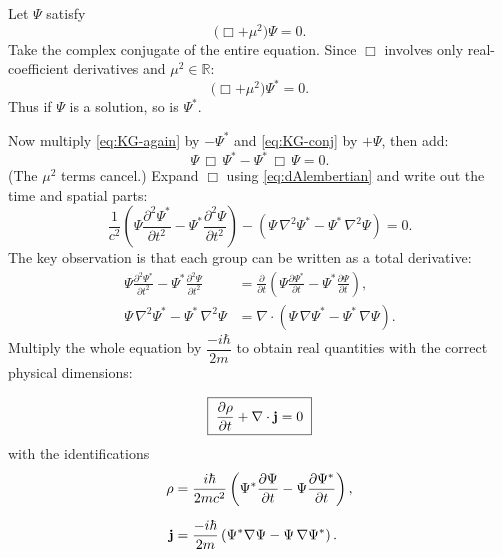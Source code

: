 \documentclass[12pt, a4paper]{article}
\theoremstyle{definition}
\begin{document}
\begin{derivation}
Let $\Psi$ satisfy
\begin{equation}\label{eq:KG-again}
    \bigl(\Box + \mu^{2}\bigr)\Psi = 0.
\end{equation}
Take the complex conjugate of the entire equation.  Since $\Box$ involves
only real-coefficient derivatives and $\mu^{2}\in\mathbb{R}$:
\begin{equation}\label{eq:KG-conj}
    \bigl(\Box + \mu^{2}\bigr)\Psi^{*} = 0.
\end{equation}
Thus if $\Psi$ is a solution, so is $\Psi^{*}$.

Now multiply \eqref{eq:KG-again} by $-\Psi^{*}$ and \eqref{eq:KG-conj} by
$+\Psi$, then add:
\begin{equation}\label{eq:subtracted}
    \Psi\,\Box\,\Psi^{*} - \Psi^{*}\,\Box\,\Psi = 0.
\end{equation}
(The $\mu^{2}$ terms cancel.)  Expand $\Box$ using \eqref{eq:dAlembertian}
and write out the time and spatial parts:
\[
    \frac{1}{c^{2}}\left(
      \Psi\frac{\partial^{2}\Psi^{*}}{\partial t^{2}}
      - \Psi^{*}\frac{\partial^{2}\Psi}{\partial t^{2}}
    \right)
    -\left(
      \Psi\,\nabla^{2}\Psi^{*}
      - \Psi^{*}\,\nabla^{2}\Psi
    \right) = 0.
\]
The key observation is that each group can be written as a total derivative:
\begin{align}
    \Psi\frac{\partial^{2}\Psi^{*}}{\partial t^{2}}
    - \Psi^{*}\frac{\partial^{2}\Psi}{\partial t^{2}}
    &= \frac{\partial}{\partial t}\!\left(
        \Psi\frac{\partial\Psi^{*}}{\partial t}
        - \Psi^{*}\frac{\partial\Psi}{\partial t}
    \right), \\[4pt]
    \Psi\,\nabla^{2}\Psi^{*}
    - \Psi^{*}\,\nabla^{2}\Psi
    &= \nabla\cdot\!\left(
        \Psi\,\nabla\Psi^{*}
        - \Psi^{*}\,\nabla\Psi
    \right).
\end{align}
Multiply the whole equation by $\dfrac{-i\hbar}{2m}$ to obtain real
quantities with the correct physical dimensions:
\end{derivation}

\begin{result}
\begin{equation}\label{eq:continuity}
    \boxed{\;
    \frac{\partial\rho}{\partial t} + \nabla\cdot\vb{j} = 0
    \;}
\end{equation}
with the identifications
\begin{align}
    \rho &= \frac{i\hbar}{2mc^{2}}
      \left(
        \Psi^{*}\frac{\partial\Psi}{\partial t}
        - \Psi\frac{\partial\Psi^{*}}{\partial t}
      \right),
    \label{eq:rho} \\[6pt]
    \vb{j} &= \frac{-i\hbar}{2m}
      \left(
        \Psi^{*}\nabla\Psi
        - \Psi\,\nabla\Psi^{*}
      \right).
    \label{eq:current}
\end{align}
\end{result}
\end{document}
